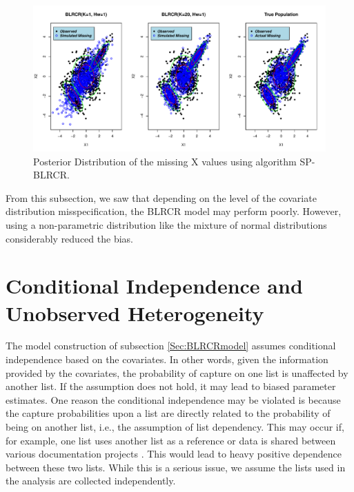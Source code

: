 \documentclass[
  12pt,
]{article}
\begin{document}
\begin{figure}[H]

{\centering \includegraphics{dissertationmain_files/figure-latex/posteriormixtureplots-1} 

}

\caption{\label{fig:mixx}Posterior Distribution of the missing X values using algorithm SP-BLRCR.}\label{fig:posteriormixtureplots}
\end{figure}

From this subsection, we saw that depending on the level of the
covariate distribution misspecification, the BLRCR model may perform
poorly. However, using a non-parametric distribution like the mixture of
normal distributions considerably reduced the bias.

\section{Conditional Independence and Unobserved Heterogeneity}
\label{Sec:condindependence}

The model construction of subsection \ref{Sec:BLRCRmodel} assumes
conditional independence based on the covariates. In other words, given
the information provided by the covariates, the probability of capture
on one list is unaffected by another list. If the assumption does not
hold, it may lead to biased parameter estimates. One reason the
conditional independence may be violated is because the capture
probabilities upon a list are directly related to the probability of
being on another list, i.e., the assumption of list dependency. This may
occur if, for example, one list uses another list as a reference or data
is shared between various documentation projects
\citep{manrique-vallier_capture-recapture_2020}. This would lead to
heavy positive dependence between these two lists. While this is a
serious issue, we assume the lists used in the analysis are collected
independently.
\end{document}
